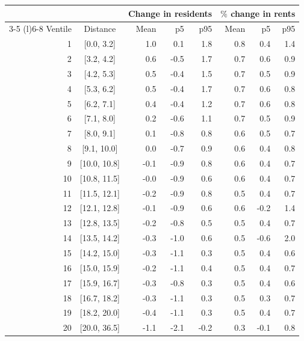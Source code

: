 \begin{tabular}{rcrrrrrr} \toprule
& & \multicolumn{3}{c}{Change in residents} & \multicolumn{3}{c}{$\%$ change in rents} \\ \cmidrule(r){3-5} \cmidrule(l){6-8}
Ventile & Distance & Mean & p5 & p95 & Mean & p5 & p95 \\
\midrule
1&[0.0, 3.2]&1.0&0.1&1.8&0.8&0.4&1.4\\
2&[3.2, 4.2]&0.6&-0.5&1.7&0.7&0.6&0.9\\
3&[4.2, 5.3]&0.5&-0.4&1.5&0.7&0.5&0.9\\
4&[5.3, 6.2]&0.5&-0.4&1.7&0.7&0.6&0.8\\
5&[6.2, 7.1]&0.4&-0.4&1.2&0.7&0.6&0.8\\
6&[7.1, 8.0]&0.2&-0.6&1.1&0.7&0.5&0.9\\
7&[8.0, 9.1]&0.1&-0.8&0.8&0.6&0.5&0.7\\
8&[9.1, 10.0]&0.0&-0.7&0.9&0.6&0.4&0.8\\
9&[10.0, 10.8]&-0.1&-0.9&0.8&0.6&0.4&0.7\\
10&[10.8, 11.5]&-0.0&-0.9&0.6&0.6&0.4&0.7\\
11&[11.5, 12.1]&-0.2&-0.9&0.8&0.5&0.4&0.7\\
12&[12.1, 12.8]&-0.1&-0.9&0.6&0.6&-0.2&1.4\\
13&[12.8, 13.5]&-0.2&-0.8&0.5&0.5&0.4&0.7\\
14&[13.5, 14.2]&-0.3&-1.0&0.6&0.5&-0.6&2.0\\
15&[14.2, 15.0]&-0.3&-1.1&0.3&0.5&0.4&0.6\\
16&[15.0, 15.9]&-0.2&-1.1&0.4&0.5&0.4&0.7\\
17&[15.9, 16.7]&-0.3&-0.8&0.3&0.5&0.4&0.6\\
18&[16.7, 18.2]&-0.3&-1.1&0.3&0.5&0.3&0.7\\
19&[18.2, 20.0]&-0.4&-1.1&0.3&0.5&0.4&0.7\\
20&[20.0, 36.5]&-1.1&-2.1&-0.2&0.3&-0.1&0.8\\
\bottomrule\end{tabular}
